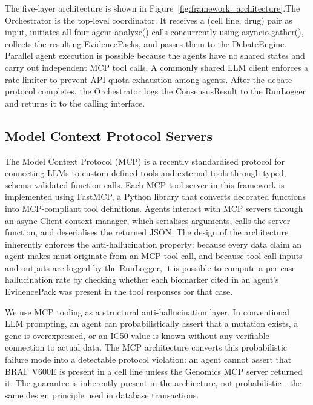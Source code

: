 \documentclass{article}
\begin{document}
The five-layer architecture is shown in Figure~\ref{fig:framework_architecture}.The Orchestrator is the top-level coordinator. It receives a (cell line, drug) pair as input, initiates all four agent analyze() calls concurrently using asyncio.gather(), collects the resulting EvidencePacks, and passes them to the DebateEngine. Parallel agent execution is possible because the agents have no shared states and carry out independent MCP tool calls. A commonly shared LLM client enforces a rate limiter to prevent API quota exhaustion among agents. After the debate protocol completes, the Orchestrator logs the ConsensusResult to the RunLogger and returns it to the calling interface.

\subsection{Model Context Protocol Servers}
The Model Context Protocol (MCP) \cite{flotho2026mcpmed, widjaja2025bioinfomcp} is a recently standardised protocol for connecting LLMs to custom defined tools and external tools through typed, schema-validated function calls. Each MCP tool server in this framework is implemented using FastMCP, a Python library that converts decorated functions into MCP-compliant tool definitions. Agents interact with MCP servers through an async Client context manager, which serialises arguments, calls the server function, and deserialises the returned JSON. The design of the architecture inherently enforces the anti-hallucination property: because every data claim an agent makes must originate from an MCP tool call, and because tool call inputs and outputs are logged by the RunLogger, it is possible to compute a per-case hallucination rate by checking whether each biomarker cited in an agent's EvidencePack was present in the tool responses for that case.

We use MCP tooling as a structural anti-hallucination layer. In conventional LLM prompting, an agent can probabilistically assert that a mutation exists, a gene is overexpressed, or an IC50 value is known without any verifiable connection to actual data. The MCP architecture converts this probabilistic failure mode into a detectable protocol violation: an agent cannot assert that BRAF V600E is present in a cell line unless the Genomics MCP server returned it. The guarantee is inherently present in the archiecture, not probabilistic - the same design principle used in database transactions.
\end{document}
